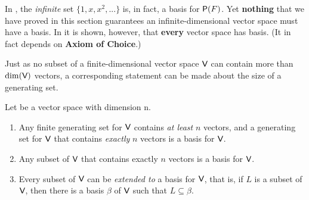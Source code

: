 In , the \emph{infinite} \LID{} set \(\{1, x, x^2, ... \}\) is, in fact, a basis for \(\textsf{P}(F)\).
Yet \textbf{nothing} that we have proved in this section guarantees an infinite-dimensional vector space must have a basis.
In  it is shown, however, that \textbf{every} vector space has basis. (It in fact depends on \textbf{Axiom of Choice}.)

Just as no \LID{} subset of a finite-dimensional vector space \(\textsf{V}\) can contain more than \(\dim(\textsf{V})\) vectors, a corresponding statement can be
made about the size of a generating set.

\begin{corollary} \label{corollary 1.10.3}
Let \V be a vector space with dimension n.
\begin{enumerate}
\item Any finite generating set for \(\textsf{V}\) contains \emph{at least} \(n\) vectors, and a generating set for \(\textsf{V}\) that contains \emph{exactly} \(n\) vectors is a basis for \(\textsf{V}\).
\item Any \LID{} subset of \(\textsf{V}\) that contains exactly \(n\) vectors is a basis for \(\textsf{V}\).
\item Every \LID{} subset of \(\textsf{V}\) can be \textit{extended to} a basis for \(\textsf{V}\),
    that is, if \(L\) is a \LID{} subset of \(\textsf{V}\), then there is a basis \(\beta\) of \(\textsf{V}\) such that \(L \subseteq \beta\).
\end{enumerate}
\end{corollary}

